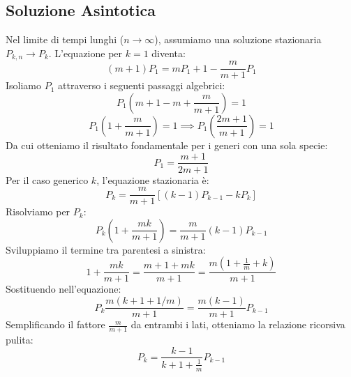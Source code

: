 \subsection{Soluzione Asintotica}
Nel limite di tempi lunghi ($n \to \infty$), assumiamo una soluzione stazionaria $P_{k,n} \to P_k$.
L'equazione per $k=1$ diventa:
\begin{equation}
    (m+1)P_1 = m P_1 + 1 - \frac{m}{m+1} P_1
\end{equation}
Isoliamo $P_1$ attraverso i seguenti passaggi algebrici:
\begin{equation}
    P_1 \left( m+1 - m + \frac{m}{m+1} \right) = 1
\end{equation}
\begin{equation}
    P_1 \left( 1 + \frac{m}{m+1} \right) = 1 \implies P_1 \left( \frac{2m+1}{m+1} \right) = 1
\end{equation}
Da cui otteniamo il risultato fondamentale per i generi con una sola specie:
\begin{equation}
    P_1 = \frac{m+1}{2m+1}
\end{equation}
Per il caso generico $k$, l'equazione stazionaria è:
\begin{equation}
    P_k = \frac{m}{m+1} \left[ (k-1)P_{k-1} - k P_k \right]
\end{equation}
Risolviamo per $P_k$:
\begin{equation}
    P_k \left( 1 + \frac{mk}{m+1} \right) = \frac{m}{m+1}(k-1)P_{k-1}
\end{equation}
Sviluppiamo il termine tra parentesi a sinistra:
\begin{equation}
    1 + \frac{mk}{m+1} = \frac{m+1+mk}{m+1} = \frac{m(1 + \frac{1}{m} + k)}{m+1}
\end{equation}
Sostituendo nell'equazione:
\begin{equation}
    P_k \frac{m(k + 1 + 1/m)}{m+1} = \frac{m(k-1)}{m+1} P_{k-1}
\end{equation}
Semplificando il fattore $\frac{m}{m+1}$ da entrambi i lati, otteniamo la relazione ricorsiva pulita:
\begin{equation}
    P_k = \frac{k-1}{k + 1 + \frac{1}{m}} P_{k-1}
\end{equation}

